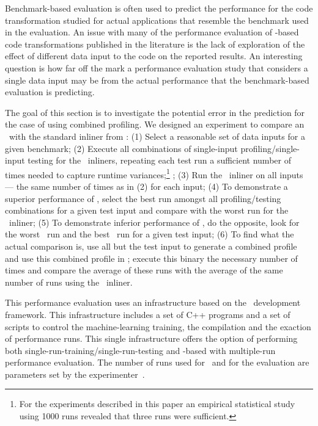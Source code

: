 
Benchmark-based evaluation is often used to predict the performance for the code transformation studied for actual applications that resemble the benchmark used in the evaluation. An issue with many of the performance evaluation of \FDO-based code transformations published in the literature is the lack of exploration of the effect of different data input to the code on the reported results. An interesting question is how far off the mark a performance evaluation study that considers a single data input may be from the actual performance that the benchmark-based evaluation is predicting. 

The goal of this section is to investigate the potential error in the prediction for the case of \FDI using combined profiling. We designed an experiment to compare an \FDI\ with the standard inliner from \llvm: (1) Select a reasonable set of data inputs for a given benchmark; (2) Execute all combinations of single-input profiling/single-input testing for the \FDO\ inliners, repeating each test run a sufficient number of times needed to capture runtime variances;\footnote{For the experiments described in this paper an empirical statistical study using 1000 runs revealed that three runs were sufficient.} ; (3) Run the \llvm\ inliner on all inputs --- the same number of times as in (2) for each input; (4) To demonstrate a superior performance of \FDI, select the best run amongst all profiling/testing combinations for a given test input and compare with the worst run for the \llvm\ inliner; (5) To demonstrate inferior performance of \FDI, do the opposite, look for the worst \FDI\ run and the best \llvm\ run for a given test input; (6) To find what the actual comparison is, use all but the test input to generate a combined profile and use this combined profile in \FDI; execute this binary the necessary number of times and compare the average of these runs with the average of the same number of runs using the \llvm\ inliner.


This performance evaluation uses an infrastructure based on the \llvm\ development framework. This infrastructure includes a set of C++ programs and a set of scripts to control the machine-learning training, the compilation and the exaction of performance runs. This single infrastructure offers the option of performing both single-run-training/single-run-testing \FDO and  \CP-based \FDO with multiple-run performance evaluation. The number of runs used for \CP\ and for the evaluation are parameters set by the experimenter~\cite{BerubePhD}.

